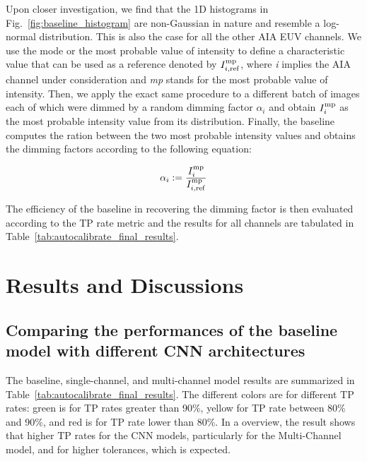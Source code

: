\documentclass[twocolumn,usenames,dvipsnames]{aastex63}
\begin{document}
Upon closer investigation, we find that the 1D histograms in Fig.~\ref{fig:baseline_histogram} are non-Gaussian in nature and resemble a log-normal distribution. This is also the case for all the other AIA EUV channels. We use the mode or the most probable value of intensity to define a characteristic value that can be used as a reference denoted by $I_{i,{\rm ref}}^{\rm mp}$, where \textit{i} implies the AIA channel under consideration and \textit{mp} stands for the most probable value of intensity.
Then, we apply the exact same procedure to a different batch of images each of which were dimmed by a random dimming factor $\alpha_i$ and obtain $I^{\rm mp}_{i}$ as the most probable intensity value from its distribution. Finally, the baseline computes the ration between the two most probable intensity values and obtains the dimming factors according to the following equation:

\begin{equation}
    \alpha_i := \frac{I^{\rm mp}_{i}}{I_{i, {\rm ref}}^{\rm mp}}
\end{equation}




The efficiency of the baseline in recovering the dimming factor is then evaluated according to the TP rate metric and the results for all channels are tabulated in Table~\ref{tab:autocalibrate_final_results}. 

\section{Results and Discussions}
 \label{Section:Results}

\subsection{Comparing the performances of the baseline model with different CNN architectures}
The baseline, single-channel, and multi-channel model results are summarized in Table~\ref{tab:autocalibrate_final_results}. The different colors are for different TP rates: green is for TP rates greater than 90\%, yellow for TP rate between 80\% and 90\%, and red is for TP rate lower than 80\%. In a overview, the result shows that higher TP rates for the CNN models, particularly for the Multi-Channel model, and for higher tolerances, which is expected.
\end{document}
